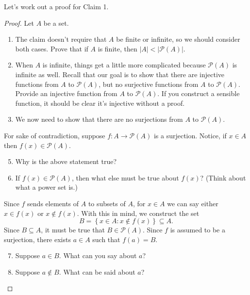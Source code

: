 \documentclass[12 pt]{article}
\renewcommand{\P}{\mathscr{P}}
\newcommand{\set}[1]{\left\{#1\right\}}
\newcommand{\esub}{\subseteq}
\theoremstyle{definition}
\theoremstyle{plain}
\theoremstyle{mytheorem}
\theoremstyle{myexample}
\theoremstyle{mydefinition}
\begin{document}
\noindent Let's work out a proof for Claim 1.
\begin{mdframed}[backgroundcolor=gray!10!]
\begin{proof}
Let $A$ be a set.\\
\begin{mdframed}[backgroundcolor=white]
\begin{enumerate}[resume]
\item The claim doesn't require that $A$ be finite or infinite, so we should consider both cases.  Prove that if $A$ is finite, then $|A|<|\P(A)|$.
\vspace{2in}

\item When $A$ is infinite, things get a little more complicated because $\P(A)$ is infinite as well.  Recall that our goal is to show that there are injective functions from $A$ to $\P(A)$, but no surjective functions from $A$ to $\P(A)$.  Provide an injective function from $A$ to $\P(A)$.  If you construct a sensible function, it should be clear it's injective without a proof.
\vspace{2in}

\item We now need to show that there are no surjections from $A$ to $\P(A)$.
\end{enumerate}
\end{mdframed}
For sake of contradiction, suppose $f: A \to \P(A)$ is a surjection.  Notice, if $x \in A$ then $f(x) \in \P(A)$.\\
\begin{mdframed}[backgroundcolor=white]
\begin{enumerate} \setcounter{enumi}{4}
\item Why is the above statement true?
\vspace{.5in}
\item If $f(x) \in \P(A)$, then what else must be true about $f(x)$?  (Think about what a power set is.)
\vspace{.5in}
\end{enumerate}
\end{mdframed}
\noindent Since $f$ sends elements of $A$ to subsets of $A$, for $x \in A$ we can say either $x \in f(x)$ or $x\notin f(x)$.  With this in mind, we construct the set
\[B = \set{x \in A : x \notin f(x)} \esub A.\]
Since $B \esub A$, it must be true that $B \in \P(A)$.  Since $f$ is assumed to be a surjection, there exists $a \in A$ such that $f(a) = B$.\\
\begin{mdframed}[backgroundcolor=white]
\begin{enumerate}\setcounter{enumi}{6}
\item Suppose $a \in B$.  What can you say about $a$?

\vspace{3in}
\item Suppose $a \notin B$.  What can be said about $a$?

\vspace{3in}
\end{enumerate}
\end{mdframed}
\end{proof}
\end{mdframed}
\end{document}
